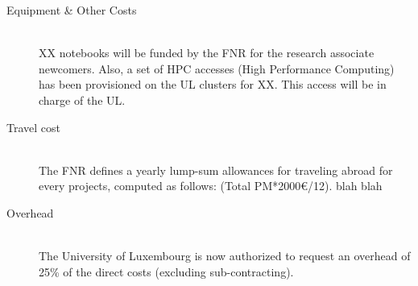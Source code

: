 \begin{description}
  \item[Equipment \& Other Costs]~\\
    XX notebooks will be funded by the FNR for the research associate newcomers.
    Also, a set of HPC accesses (High Performance Computing) has been
    provisioned on the UL clusters for XX. This access will be in charge of the UL. 


  \item[Travel cost]~\\
    The FNR defines a yearly lump-sum allowances for traveling abroad for every
    projects, computed as follows: (Total PM*2000\euro{}/12).
    blah blah


  \item[Overhead]~\\
    The University of Luxembourg is now authorized to request an overhead of
    25\% of the direct costs (excluding sub-contracting). 
\end{description}


% 
